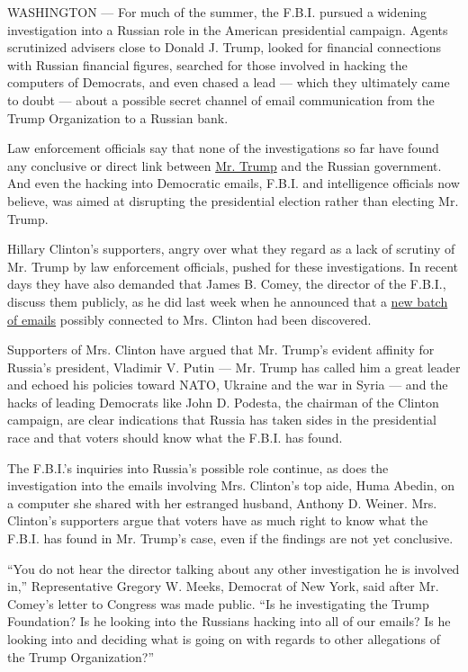 WASHINGTON --- For much of the summer, the F.B.I. pursued a widening
investigation into a Russian role in the American presidential campaign.
Agents scrutinized advisers close to Donald J. Trump, looked for
financial connections with Russian financial figures, searched for those
involved in hacking the computers of Democrats, and even chased a lead
--- which they ultimately came to doubt --- about a possible secret
channel of email communication from the Trump Organization to a Russian
bank.

Law enforcement officials say that none of the investigations so far
have found any conclusive or direct link between
\href{https://www.nytimes.com/2020/07/01/us/politics/trump-putin-russia-taliban-bounty.html}{Mr.
Trump} and the Russian government. And even the hacking into Democratic
emails, F.B.I. and intelligence officials now believe, was aimed at
disrupting the presidential election rather than electing Mr. Trump.

Hillary Clinton's supporters, angry over what they regard as a lack of
scrutiny of Mr. Trump by law enforcement officials, pushed for these
investigations. In recent days they have also demanded that James B.
Comey, the director of the F.B.I., discuss them publicly, as he did last
week when he announced that a
\href{http://www.nytimes.com/2016/10/29/us/politics/fbi-hillary-clinton-email.html}{new
batch of emails} possibly connected to Mrs. Clinton had been discovered.

Supporters of Mrs. Clinton have argued that Mr. Trump's evident affinity
for Russia's president, Vladimir V. Putin --- Mr. Trump has called him a
great leader and echoed his policies toward NATO, Ukraine and the war in
Syria --- and the hacks of leading Democrats like John D. Podesta, the
chairman of the Clinton campaign, are clear indications that Russia has
taken sides in the presidential race and that voters should know what
the F.B.I. has found.

The F.B.I.'s inquiries into Russia's possible role continue, as does the
investigation into the emails involving Mrs. Clinton's top aide, Huma
Abedin, on a computer she shared with her estranged husband, Anthony D.
Weiner. Mrs. Clinton's supporters argue that voters have as much right
to know what the F.B.I. has found in Mr. Trump's case, even if the
findings are not yet conclusive.

``You do not hear the director talking about any other investigation he
is involved in,'' Representative Gregory W. Meeks, Democrat of New York,
said after Mr. Comey's letter to Congress was made public. ``Is he
investigating the Trump Foundation? Is he looking into the Russians
hacking into all of our emails? Is he looking into and deciding what is
going on with regards to other allegations of the Trump Organization?''

